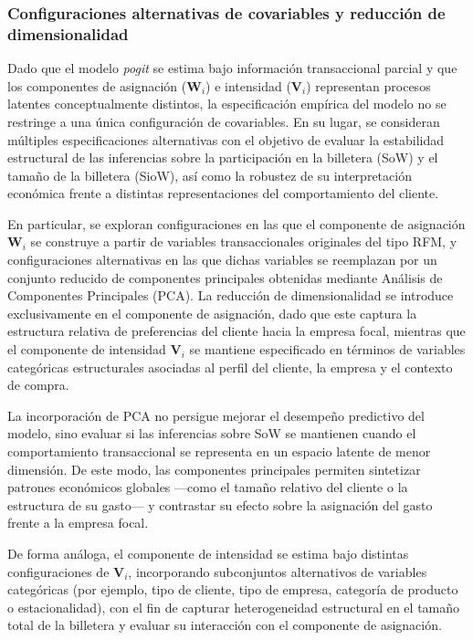 \subsubsection{Configuraciones alternativas de covariables y reducción de dimensionalidad}

    Dado que el modelo \emph{pogit} se estima bajo información transaccional parcial y que los componentes de asignación (\(\boldsymbol{W}_i\)) e intensidad (\(\boldsymbol{V}_i\)) representan procesos latentes conceptualmente distintos, la especificación empírica del modelo no se restringe a una única configuración de covariables. En su lugar, se consideran múltiples especificaciones alternativas con el objetivo de evaluar la estabilidad estructural de las inferencias sobre la participación en la billetera (SoW) y el tamaño de la billetera (SioW), así como la robustez de su interpretación económica frente a distintas representaciones del comportamiento del cliente.
    
    En particular, se exploran configuraciones en las que el componente de asignación \(\boldsymbol{W}_i\) se construye a partir de variables transaccionales originales del tipo RFM, y configuraciones alternativas en las que dichas variables se reemplazan por un conjunto reducido de componentes principales obtenidas mediante Análisis de Componentes Principales (PCA). La reducción de dimensionalidad se introduce exclusivamente en el componente de asignación, dado que este captura la estructura relativa de preferencias del cliente hacia la empresa focal, mientras que el componente de intensidad \(\boldsymbol{V}_i\) se mantiene especificado en términos de variables categóricas estructurales asociadas al perfil del cliente, la empresa y el contexto de compra.
    
    La incorporación de PCA no persigue mejorar el desempeño predictivo del modelo, sino evaluar si las inferencias sobre SoW se mantienen cuando el comportamiento transaccional se representa en un espacio latente de menor dimensión. De este modo, las componentes principales permiten sintetizar patrones económicos globales —como el tamaño relativo del cliente o la estructura de su gasto— y contrastar su efecto sobre la asignación del gasto frente a la empresa focal.
    
    De forma análoga, el componente de intensidad se estima bajo distintas configuraciones de \(\boldsymbol{V}_i\), incorporando subconjuntos alternativos de variables categóricas (por ejemplo, tipo de cliente, tipo de empresa, categoría de producto o estacionalidad), con el fin de capturar heterogeneidad estructural en el tamaño total de la billetera y evaluar su interacción con el componente de asignación.
    
